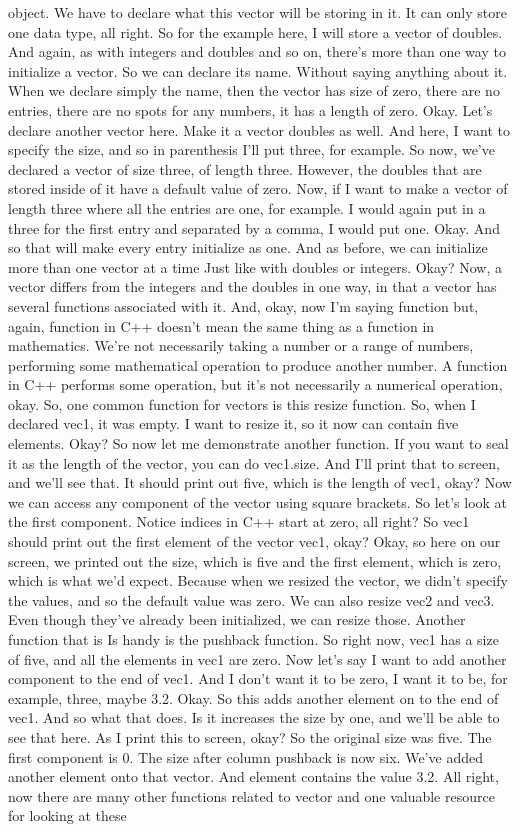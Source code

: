\documentclass[10pt]{article}
\begin{document}
object. We have to declare what this vector will be storing in it. It can only store one data type, all right. So for the example here, I will store a vector of doubles. And again, as with integers and doubles and so on, there's more than one way to initialize a vector. So we can declare its name. Without saying anything about it. When we declare simply the name, then the vector has size of zero, there are no entries, there are no spots for any numbers, it has a length of zero. Okay. Let's declare another vector here. Make it a vector doubles as well. And here, I want to specify the size, and so in parenthesis I'll put three, for example. So now, we've declared a vector of size three, of length three. However, the doubles that are stored inside of it have a default value of zero. Now, if I want to make a vector of length three where all the entries are one, for example. I would again put in a three for the first entry and separated by a comma, I would put one. Okay. And so that will make every entry initialize as one. And as before, we can initialize more than one vector at a time Just like with doubles or integers. Okay? Now, a vector differs from the integers and the doubles in one way, in that a vector has several functions associated with it. And, okay, now I'm saying function but, again, function in C++ doesn't mean the same thing as a function in mathematics. We're not necessarily taking a number or a range of numbers, performing some mathematical operation to produce another number. A function in C++ performs some operation, but it's not necessarily a numerical operation, okay. So, one common function for vectors is this resize function. So, when I declared vec1, it was empty. I want to resize it, so it now can contain five elements. Okay? So now let me demonstrate another function. If you want to seal it as the length of the vector, you can do vec1.size. And I'll print that to screen, and we'll see that. It should print out five, which is the length of vec1, okay? Now we can access any component of the vector using square brackets. So let's look at the first component. Notice indices in C++ start at zero, all right? So vec1 should print out the first element of the vector vec1, okay? Okay, so here on our screen, we printed out the size, which is five and the first element, which is zero, which is what we'd expect. Because when we resized the vector, we didn't specify the values, and so the default value was zero. We can also resize vec2 and vec3. Even though they've already been initialized, we can resize those. Another function that is Is handy is the push\-back function. So right now, vec1 has a size of five, and all the elements in vec1 are zero. Now let's say I want to add another component to the end of vec1. And I don't want it to be zero, I want it to be, for example, three, maybe 3.2. Okay. So this adds another element on to the end of vec1. And so what that does. Is it increases the size by one, and we'll be able to see that here. As I print this to screen, okay? So the original size was five. The first component is 0. The size after column pushback is now six. We've added another element onto that vector. And element contains the value 3.2. All right, now there are many other functions related to vector and one valuable resource for looking at these 
\end{document}

